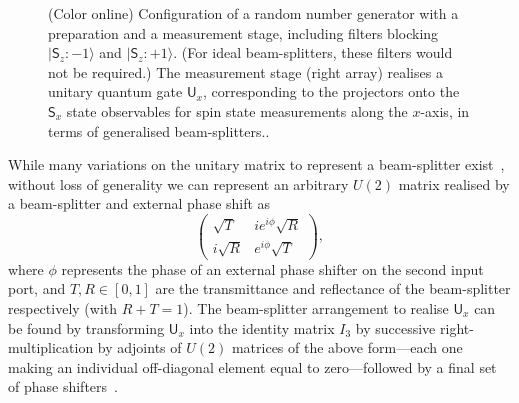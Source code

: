 \documentclass[%
 preprint,
 showpacs,
 showkeys,
 amsmath,
 amssymb,
 aps,
 pra,
 ]{revtex4-1}
\theoremstyle{definition}
\begin{document}
\begin{figure}[ht]
\begin{center}
\begin{picture}
\end{picture}
\end{center}
\caption{(Color online) Configuration of a random number generator
with a preparation and a measurement stage, including filters blocking
$\vert \textsf{S}_z : -1 \rangle$
and
$\vert \textsf{S}_z : +1 \rangle$.
(For ideal beam-splitters, these filters would not be required.)
The measurement stage (right array) realises a unitary quantum gate $\textsf{U}_x$, corresponding  to the projectors onto
the $\textsf{S}_x$ state observables for spin state measurements along the $x$-axis,
in terms of generalised beam-splitters..
\label{2012-incomput-proofsC-f1}}
\end{figure}
\fi

While many variations on the unitary matrix to represent a beam-splitter exist~\cite{rzbb,zeilinger:882,Campos:1989fk,green-horn-zei}, without loss of generality we can represent an arbitrary $U(2)$ matrix realised by a beam-splitter and external phase shift as
\begin{equation}
	\begin{pmatrix}
\sqrt{T} & i e^{i \phi}\sqrt{R}\\
i\sqrt{R} & e^{i \phi}\sqrt{T}
\end{pmatrix},
\end{equation}
where $\phi$ represents the phase of an external phase shifter on the second input port, and $T,R\in [0,1]$ are the transmittance and reflectance of the beam-splitter respectively (with $R+T=1$).
The beam-splitter arrangement to realise $\textsf{U}_x$ can be found by transforming $\textsf{U}_x$ into the identity matrix $I_3$ by successive right-multiplication by adjoints of $U(2)$ matrices of the above form---each one making an individual off-diagonal element equal to zero---followed by a final set of phase shifters~\cite{rzbb}.
\end{document}
